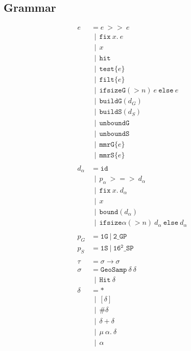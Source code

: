 \documentclass{article}
\newcommand {\gbar} {~~|~~}
\newcommand {\chain}{\mathtt{>>}}
\newcommand {\rightFish}{\mathtt{>=>}}
\newcommand {\fix}{\mathtt{fix}}
\newcommand {\test}{\mathtt{test}}
\newcommand {\filt}{\mathtt{filt}}
\newcommand {\isect}{\mathtt{hit}}
\newcommand {\buildG}{\mathtt{buildG}}
\newcommand {\buildS}{\mathtt{buildS}}
\newcommand {\unboundG}{\mathtt{unboundG}}
\newcommand {\unboundS}{\mathtt{unboundS}}
\newcommand {\mmrG}{\mathtt{mmrG}}
\newcommand {\mmrS}{\mathtt{mmrS}}
\newcommand {\oneS}{\mathtt{1S}}
\newcommand {\oneG}{\mathtt{1G}}
\newcommand {\sampP}{\mathtt{16^2\_SP}}
\newcommand {\twoGP}{\mathtt{2\_GP}}
\newcommand {\geosamp}{\mathtt{GeoSamp}}
\newcommand {\hit}{\mathtt{Hit}}
\newcommand {\bound}{\mathtt{bound}}
\begin{document}
\subsection{Grammar}
\begin{align*}
e &= e~\chain~e \\
&\gbar \fix~x.~e \\
&\gbar x \\
&\gbar \isect \\
&\gbar \test \{ e \} \\
&\gbar \filt \{ e \} \\
&\gbar \mathtt{ifsizeG}(>n)~e \mathtt{~else~} e \\
&\gbar \buildG ( d_G ) \\
&\gbar \buildS ( d_S ) \\
&\gbar \unboundG \\
&\gbar \unboundS \\
&\gbar \mmrG \{ e \} \\
&\gbar \mmrS \{ e \} \\
\\
d_\alpha &= \mathtt{id} \\
&\gbar p_\alpha~\rightFish~d_\alpha \\
&\gbar \fix~x.~d_\alpha \\
&\gbar x \\
&\gbar \bound (d_\alpha) \\
&\gbar \mathtt{ifsize\alpha}(>n)~d_\alpha \mathtt{~else~} d_\alpha \\
\\
p_G &= \oneG~|~\twoGP \\
p_S &= \oneS~|~\sampP \\
\\
\tau &= \sigma \to \sigma \\
\sigma &= \geosamp~\delta~\delta \\
&\gbar \hit~\delta \\
\delta &= * \\
&\gbar [\delta] \\
&\gbar \# \delta \\
&\gbar \delta + \delta \\
&\gbar \mu~\alpha.~\delta \\
&\gbar \alpha \\
\end{align*}
\end{document}
